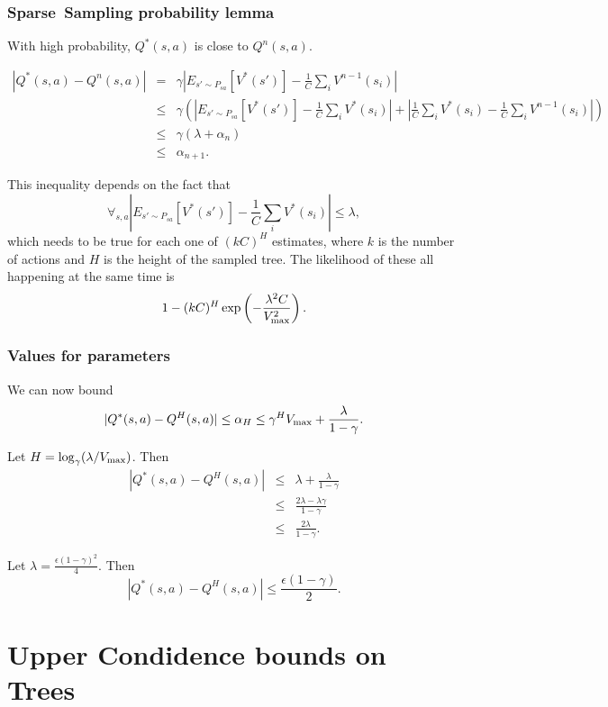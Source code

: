 \subsubsection{{\bf Sparse~Sampling} probability lemma} With high probability, $Q^*(s,a)$ is close to $Q^n(s,a)$.

\begin{eqnarray}
|Q^*(s,a)-Q^n(s,a)| &=& \gamma\left|E_{s'\sim P_{sa}}[V^*(s')] - \frac 1 C \sum_i V^{n-1}(s_i)\right| \nonumber\\
&\leq& \gamma \left(\left|E_{s'\sim P_{sa}}[V^*(s')] - \frac 1 C \sum_i V^*(s_i)\right| + \left|\frac 1 C \sum_i V^*(s_i) - \frac 1 C \sum_i V^{n-1}(s_i)\right|\right)\\
&\leq& \gamma (\lambda + \alpha_n)\\
&\leq& \alpha_{n+1}.
\end{eqnarray}

This inequality depends on the fact that
$$\forall_{s,a}\left|E_{s'\sim P_{sa}}[V^*(s')] - \frac 1 C \sum_i V^*(s_i)\right|\leq \lambda,$$
which needs to be true for each one of $(kC)^H$ estimates, where $k$ is the number of actions and $H$ is the height of the sampled tree. The likelihood of these all happening at the same time is
$$1-(kC)^H\exp\left(-\frac{\lambda^2 C}{V_{\rm max}^2}\right).$$

\subsubsection{Values for parameters}

We can now bound 
$$|Q^*(s,a)-Q^H(s,a)|\leq \alpha_H \leq \gamma^HV_{\rm max} + \frac{\lambda}{1-\gamma}.$$

Let $H=\log_{\gamma}(\lambda/V_{\rm max})$. Then
\begin{eqnarray}
|Q^*(s,a)-Q^H(s,a)|&\leq& \lambda + \frac{\lambda}{1-\gamma}\\
&\leq& \frac{2\lambda-\lambda\gamma}{1-\gamma} \\
&\leq& \frac{2\lambda}{1-\gamma}.
\end{eqnarray}

Let $\lambda = \frac {\epsilon(1-\gamma)^2}{4}$. Then
$$|Q^*(s,a)-Q^H(s,a)| \leq \frac {\epsilon(1-\gamma)}2.$$



\section{Upper Condidence bounds on Trees}

